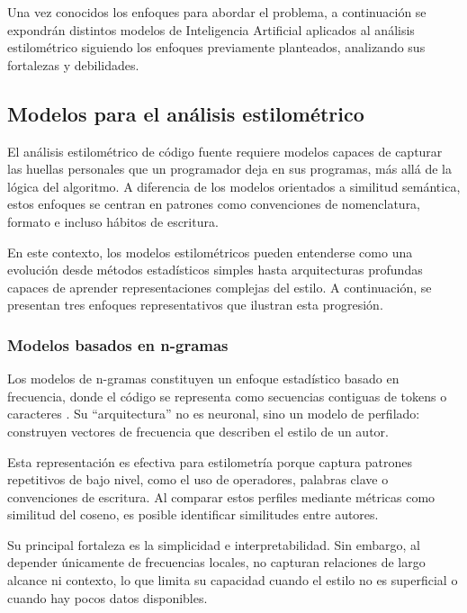 Una vez conocidos los enfoques para abordar el problema, a continuación se expondrán distintos modelos de Inteligencia Artificial aplicados al análisis estilométrico siguiendo los enfoques previamente planteados, analizando sus fortalezas y debilidades.

\subsection{Modelos para el análisis estilométrico}

El análisis estilométrico de código fuente requiere modelos capaces de capturar las huellas personales que un programador deja en sus programas, más allá de la lógica del algoritmo. A diferencia de los modelos orientados a similitud semántica, estos enfoques se centran en patrones como convenciones de nomenclatura, formato e incluso hábitos de escritura. 

En este contexto, los modelos estilométricos pueden entenderse como una evolución desde métodos estadísticos simples hasta arquitecturas profundas capaces de aprender representaciones complejas del estilo. A continuación, se presentan tres enfoques representativos que ilustran esta progresión.

\subsubsection{Modelos basados en n-gramas}

Los modelos de n-gramas constituyen un enfoque estadístico basado en frecuencia, donde el código se representa como secuencias contiguas de tokens o caracteres \cite{Burrows2007Ngrams}. Su ``arquitectura'' no es neuronal, sino un modelo de perfilado: construyen vectores de frecuencia que describen el estilo de un autor.

Esta representación es efectiva para estilometría porque captura patrones repetitivos de bajo nivel, como el uso de operadores, palabras clave o convenciones de escritura. Al comparar estos perfiles mediante métricas como similitud del coseno, es posible identificar similitudes entre autores.

Su principal fortaleza es la simplicidad e interpretabilidad. Sin embargo, al depender únicamente de frecuencias locales, no capturan relaciones de largo alcance ni contexto, lo que limita su capacidad cuando el estilo no es superficial o cuando hay pocos datos disponibles.

